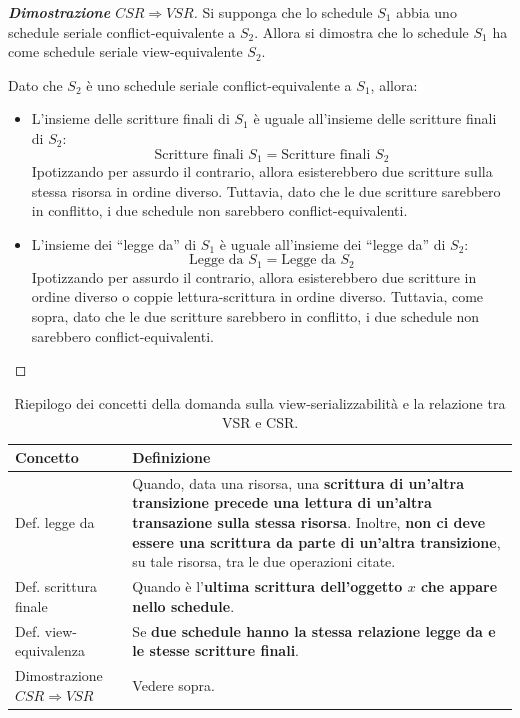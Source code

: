 \documentclass[a4paper]{article}
\newcommand{\dquotes}[1]{``#1''}
\begin{document}
\begin{enumerate}
		\noindent
		\begin{proof}[\textbf{Dimostrazione} $CSR \Longrightarrow VSR$]
			Si supponga che lo schedule $S_{1}$ abbia uno schedule seriale conflict-equivalente a $S_{2}$. Allora si dimostra che lo schedule $S_{1}$ ha come schedule seriale view-equivalente $S_{2}$.\newline
			
			\noindent
			Dato che $S_{2}$ è uno schedule seriale conflict-equivalente a $S_{1}$, allora:
			\begin{itemize}
				\item L'insieme delle scritture finali di $S_{1}$ è uguale all'insieme delle scritture finali di $S_{2}$:
				\begin{equation*}
					\text{Scritture finali } S_{1} = \text{Scritture finali } S_{2}
				\end{equation*}
				Ipotizzando per assurdo il contrario, allora esisterebbero due scritture sulla stessa risorsa in ordine diverso. Tuttavia, dato che le due scritture sarebbero in conflitto, i due schedule non sarebbero conflict-equivalenti.
				
				\item L'insieme dei \dquotes{legge da} di $S_{1}$ è uguale all'insieme dei \dquotes{legge da} di $S_{2}$:
				\begin{equation*}
					\text{Legge da } S_{1} = \text{Legge da } S_{2}
				\end{equation*}
				Ipotizzando per assurdo il contrario, allora esisterebbero due scritture in ordine diverso o coppie lettura-scrittura in ordine diverso. Tuttavia, come sopra, dato che le due scritture sarebbero in conflitto, i due schedule non sarebbero conflict-equivalenti.
			\end{itemize}
		\end{proof}
		
		\begin{table}[!htp]
			\centering
			\begin{tabular}{@{} l p{21em} @{}}
				\toprule
				Concetto & Definizione \\
				\midrule
				Def. legge da 						& Quando, data una risorsa, una \textbf{scrittura di un'altra transizione precede una lettura di un'altra transazione sulla stessa risorsa}. Inoltre, \textbf{non ci deve essere una scrittura da parte di un'altra transizione}, su tale risorsa, tra le due operazioni citate. \\ [.7em]
				Def. scrittura finale 				& Quando è l'\textbf{ultima scrittura dell'oggetto $x$ che appare nello schedule}. \\ [.7em]
				Def. view-equivalenza				& Se \textbf{due schedule hanno la stessa relazione legge da e le stesse scritture finali}. \\ [.7em]
				Dimostrazione $CSR \Rightarrow VSR$	& Vedere sopra. \\
				\bottomrule
			\end{tabular}
			\caption{Riepilogo dei concetti della domanda sulla view-serializzabilità e la relazione tra VSR e CSR.}
		\end{table}\newpage
		

\end{enumerate}
\end{document}
